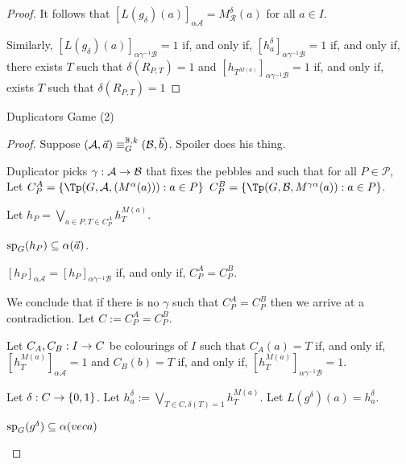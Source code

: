 \documentclass[../main/thesis.tex]{subfiles}
\begin{document}
\begin{proof}
  It follows that $[L(g_{\delta})(a)]_{\alpha \mathcal{A}} =
  M^{\delta}_{\mathcal{R}}(a)$ for all $a \in I$.

  Similarly, $[L(g_{\delta})(a)]_{\alpha \gamma^{-1}\mathcal{B}} = 1$ if, and
  only if, $[h^{\delta}_a]_{\alpha \gamma^{-1}\mathcal{B}} = 1$ if, and only if,
  there exists $T$ such that $\delta(R_{P, T}) = 1$ and $[h_{T^{M(a)}}]_{\alpha
    \gamma^{-1} \mathcal{B}} = 1$ if, and only if, exists $T$ such that
  $\delta(R_{P, T}) = 1$
  

 
\end{proof}

\begin{lem}
  Duplicators Game (2)
\end{lem}
\begin{proof}
  Suppose $(\mathcal{A}, \vec{a}) \equiv^{\mathbb{B}, k}_G (\mathcal{B}, \vec{b})$.
  Spoiler does his thing.

  Duplicator picks $\gamma: \mathcal{A} \rightarrow \mathcal{B}$ that fixes the pebbles
  and such that for all $P \in \mathcal{P}$, Let $C^A_P = \{\Tp(G, \mathcal{A},
  (M^{\alpha}(a))) : a \in P\}$ $C^B_P = \{\Tp(G, \mathcal{B}, M^{\gamma
    \alpha}(a)): a \in P\}$.

  Let $h_P = \bigvee_{a \in P, T \in C^A_P} h^{M(a)}_T$.
 
  \begin{claim}
    $\text{sp}_G(h_P) \subseteq \alpha(\vec{a})$.
  \end{claim}

  \begin{claim}
    $[h_P]_{\alpha \mathcal{A}} = [h_P]_{\alpha \gamma^{-1}\mathcal{B}}$ if, and
    only if, $C^A_P = C^B_P$.
  \end{claim}

  We conclude that if there is no $\gamma$ such that $C^A_P = C^B_P$ then we
  arrive at a contradiction. Let $C := C^A_P = C^B_P$.

  Let $C_A, C_B : I \rightarrow C$ be colourings of $I$ such that $C_A(a) = T$ if, and
  only if, $[h^{M(a)}_T]_{\alpha \mathcal{A}} = 1$ and $C_B(b) = T$ if, and only
  if, $[h^{M(a)}_T]_{\alpha \gamma^{-1} \mathcal{B}} = 1$.

  Let $\delta : C \rightarrow \{0,1\}$. Let $h^\delta_{a} := \bigvee_{T \in C, \delta
    (T) = 1} h^{M(a)}_T$. Let $L(g^\delta)(a) = h^{\delta}_a$.

  \begin{claim}
    $\text{sp}_G (g^{\delta}) \subseteq \alpha(vec{a})$
  \end{claim}


\end{proof}
\end{document}
